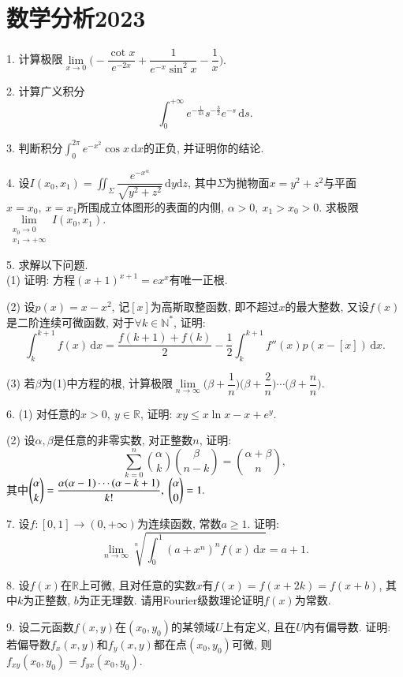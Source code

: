 \documentclass[12pt, a4paper, twoside]{ctexart}%
\newcommand{\rmd}{\mathrm{d}} %
\begin{document}
	\section{数学分析2023}
	1. 计算极限$\lim\limits_{x\rightarrow0}$$\bigg(-\dfrac{\cot x}{e^{-2x}}+\dfrac{1}{e^{-x}\sin^2x}-\dfrac{1}{x}\bigg).$\par 
	2. 计算广义积分\[
	\int_0^{+\infty}e^{-\frac{1}{4s}}s^{-\frac{3}{2}}e^{-s}\,\rmd s.\]\par 
	3. 判断积分$\int_0^{2\pi}e^{-x^2}\cos x\,\rmd x$的正负, 并证明你的结论.\par
	4. 设$I(x_0,x_1)=\iint_\Sigma\dfrac{e^{-x^\alpha}}{\sqrt{y^2+z^2}}\,\rmd y\rmd z$, 其中$\Sigma$为抛物面$x=y^2+z^2$与平面$x=x_0,\ x=x_1$所围成立体图形的表面的内侧, $\alpha>0,\ x_1>x_0>0$. 求极限$\lim\limits_{\substack{x_0\rightarrow0\\x_1\rightarrow+\infty}}I(x_0, x_1).$\par 
	5. 求解以下问题.\\
	\hspace{1.2em}(1) 证明: 方程$(x+1)^{x+1}=ex^x$有唯一正根.\par
	\hspace{1.2em}(2) 设$p(x)=x-x^2$, 记$[x]$为高斯取整函数, 即不超过$x$的最大整数, 又设$f(x)$是二阶连续可微函数, 对于$\forall k\in\mathbb{N}^*$, 证明: \[
	\int_k^{k+1}f(x)\,\rmd x=\dfrac{f(k+1)+f(k)}{2}-\dfrac{1}{2}\int_k^{k+1}f''(x)p(x-[x])\,\rmd x.\]\par 
	\hspace{1.2em}(3) 若$\beta$为(1)中方程的根, 计算极限$\lim\limits_{n\to \infty}\bigg(\beta+\dfrac{1}{n}\bigg)\bigg(\beta+\dfrac{2}{n}\bigg)\cdots\bigg(\beta+\dfrac{n}{n}\bigg)$.\par 
	6. (1) 对任意的$x>0,\ y\in\mathbb{R}$, 证明: $xy\leq x\ln x-x+e^y$.\par 
	\hspace{1.2em}(2) 设$\alpha,\beta$是任意的非零实数, 对正整数$n$, 证明:\[
	\sum_{k=0}^{n}\binom{\alpha}{k}\binom{\beta}{n-k}=\binom{\alpha+\beta}{n},\]
	\hspace{1.2em}其中$\dbinom{\alpha}{k}=\dfrac{\alpha(\alpha-1)\cdots(\alpha-k+1)}{k!},\ \dbinom{\alpha}{0}=1.$\par 
	7. 设$f: [0,1]\to(0,+\infty)$为连续函数, 常数$a\ge1$. 证明: \[
	\lim\limits_{n\to\infty}\sqrt[n]{\int_0^1(a+x^n)^nf(x)\,\rmd x}=a+1.\]\par 
	8. 设$f(x)$在$\mathbb{R}$上可微, 且对任意的实数$x$有$f(x)=f(x+2k)=f(x+b)$, 其中$k$为正整数, $b$为正无理数. 请用Fourier级数理论证明$f(x)$为常数.\par
	9. 设二元函数$f(x,y)$在$(x_0,y_0)$的某领域$U$上有定义, 且在$U$内有偏导数. 证明: 若偏导数$f_x(x,y)$和$f_y(x,y)$都在点$(x_0,y_0)$可微, 则$f_{xy}(x_0,y_0)=f_{yx}(x_0,y_0).$\par 
	\clearpage
\end{document}
